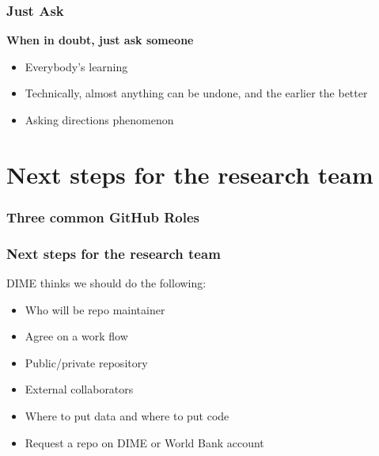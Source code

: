 \documentclass[aspectratio=169]{beamer} %
\begin{document}
\begin{frame}
\frametitle{Just Ask}

	\textbf{When in doubt, just ask someone}

	\vspace{1cm}
	\begin{itemize}
		\item Everybody's learning
		\item Technically, almost anything can be undone, and the earlier the better
		\item Asking directions phenomenon
	\end{itemize}


\end{frame}

\section{Next steps for the research team}

\begin{frame}
\frametitle{Three common GitHub Roles}

	

\end{frame}

\begin{frame}
\frametitle{Next steps for the research team}

	DIME thinks we should do the following:

	\begin{itemize}
		\item Who will be repo maintainer
		\item Agree on a work flow
		\item Public/private repository
		\item External collaborators
		\item Where to put data and where to put code
		\item Request a repo on DIME or World Bank account
	\end{itemize}

\end{frame}




\end{document}
